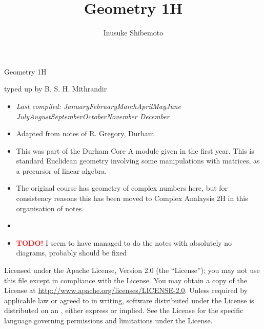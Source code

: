\documentclass[letter-paper]{tufte-book}
\title{Geometry 1H}
\author[]{Inusuke Shibemoto}
\newcommand{\monthyear}{%
  \ifcase\month\or January\or February\or March\or April\or May\or June\or
  July\or August\or September\or October\or November\or
  December\fi\space\number\year
}
\newcommand{\TODO}{\textcolor{red}{\bf TODO!}\xspace}
\begin{document}



\chapter*{}

\begin{fullwidth}

\par \begin{center}{\Huge Geometry 1H}\end{center}

\vspace*{5mm}

\par \begin{center}{\Large typed up by B. S. H. Mithrandir}\end{center}

\vspace*{5mm}

\begin{itemize}
  \item \textit{Last compiled: \monthyear}
  \item Adapted from notes of R. Gregory, Durham
  \item This was part of the Durham Core A module given in the first year. This
  is standard Euclidean geometry involving some manipulations with matrices, as
  a precursor of linear algebra.
  \item The original course has geometry of complex numbers here, but for
  consistency reasons this has been moved to Complex Analaysis 2H in this
  organisation of notes.
  \item[]
  \item \TODO I seem to have managed to do the notes with
  absolutely no diagrams, probably should be fixed
\end{itemize}

\par

\par Licensed under the Apache License, Version 2.0 (the ``License''); you may not
use this file except in compliance with the License. You may obtain a copy
of the License at \url{http://www.apache.org/licenses/LICENSE-2.0}. Unless
required by applicable law or agreed to in writing, software distributed
under the License is distributed on an , either express or implied. See the
License for the specific language governing permissions and limitations
under the License.
\end{fullwidth}
\end{document}
